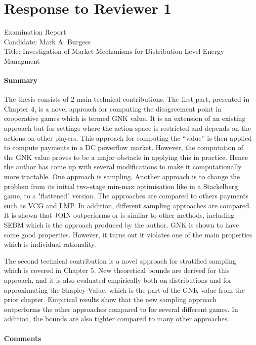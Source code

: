 \documentclass{article}
\begin{document}
\section{Response to Reviewer 1}

Examination Report\\
Candidate: Mark A. Burgess\\
Title: Investigation of Market Mechanisms for Distribution Level Energy Managment

\paragraph{Summary}

The thesis consists of 2 main technical contributions. The first part, presented in Chapter 4, is a novel
approach for computing the disagreement point in cooperative games which is termed GNK value. It
is an extension of an existing approach but for settings where the action space is restricted and
depends on the actions on other players. This approach for computing the “value” is then applied to
compute payments in a DC powerflow market. However, the computation of the GNK value proves
to be a major obstacle in applying this in practice. Hence the author has come up with several
modifications to make it computationally more tractable. One approach is sampling. Another
approach is to change the problem from its initial two-stage min-max optimisation like in a
Stackelberg game, to a "flattened" version. The approaches are compared to others payments such
as VCG and LMP. In addition, different sampling approaches are compared. It is shown that JOIN
outperforms or is similar to other methods, including SEBM which is the approach produced by the
author. GNK is shown to have some good properties. However, it turns out it violates one of the
main properties which is individual rationality.

The second technical contribution is a novel approach for stratified sampling which is covered in
Chapter 5. New theoretical bounds are derived for this approach, and it is also evaluated empirically
both on distributions and for approximating the Shapley Value, which is the part of the GNK value
from the prior chapter. Empirical results show that the new sampling approach outperforms the
other approaches compared to for several different games. In addition, the bounds are also tighter
compared to many other approaches.

\paragraph{Comments}
\end{document}
